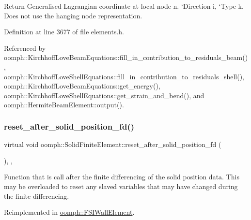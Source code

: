 Return Generalised Lagrangian coordinate at local node n. `\+Direction\textquotesingle{} i, `\+Type\textquotesingle{} k. Does not use the hanging node representation. 



Definition at line 3677 of file elements.\+h.



Referenced by oomph\+::\+Kirchhoff\+Love\+Beam\+Equations\+::fill\+\_\+in\+\_\+contribution\+\_\+to\+\_\+residuals\+\_\+beam(), oomph\+::\+Kirchhoff\+Love\+Shell\+Equations\+::fill\+\_\+in\+\_\+contribution\+\_\+to\+\_\+residuals\+\_\+shell(), oomph\+::\+Kirchhoff\+Love\+Beam\+Equations\+::get\+\_\+energy(), oomph\+::\+Kirchhoff\+Love\+Shell\+Equations\+::get\+\_\+strain\+\_\+and\+\_\+bend(), and oomph\+::\+Hermite\+Beam\+Element\+::output().

\mbox{\label{classoomph_1_1SolidFiniteElement_afab2124e079912fe9bf39bf9df8a42c2}} 
\subsubsection{\texorpdfstring{reset\+\_\+after\+\_\+solid\+\_\+position\+\_\+fd()}{reset\_after\_solid\_position\_fd()}}
{\footnotesize\ttfamily virtual void oomph\+::\+Solid\+Finite\+Element\+::reset\+\_\+after\+\_\+solid\+\_\+position\+\_\+fd (\begin{DoxyParamCaption}{ }\end{DoxyParamCaption})\hspace{0.3cm}{\ttfamily [inline]}, {\ttfamily [protected]}, {\ttfamily [virtual]}}



Function that is call after the finite differencing of the solid position data. This may be overloaded to reset any slaved variables that may have changed during the finite differencing. 



Reimplemented in \hyperlink{classoomph_1_1FSIWallElement_ae960e2a896fc81320f08cdbda6dc6526}{oomph\+::\+F\+S\+I\+Wall\+Element}.



